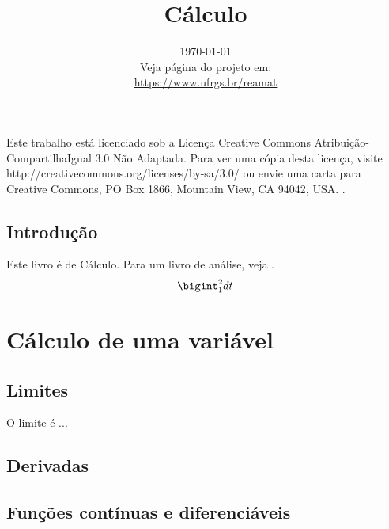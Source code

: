\documentclass[12pt]{book}
\begin{document}
\frontmatter

\title{Cálculo}
\date{\today\vspace{1cm}\\\small{Veja página do projeto em:\\
\url{https://www.ufrgs.br/reamat}}}

\maketitle





\newpage

\par Este trabalho está licenciado sob a Licença Creative Commons Atribuição-CompartilhaIgual 3.0 Não Adaptada. Para ver uma cópia desta licença, visite http://creativecommons.org/licenses/by-sa/3.0/ ou envie uma carta para Creative Commons, PO Box 1866, Mountain View, CA 94042, USA.
.


\mainmatter

\tableofcontents
\listoffigures
\listoftables

\cleardoublepage
\chapter*{Introdução}

Este livro é de Cálculo. Para um livro de análise, veja \cite{Rudin}. $$\bigint_1^2 dt$$
\layout

\part{Cálculo de uma variável}

\chapter{Limites}
O limite é ... 
\chapter{Derivadas}

\chapter{Funções contínuas e diferenciáveis}
\end{document}
